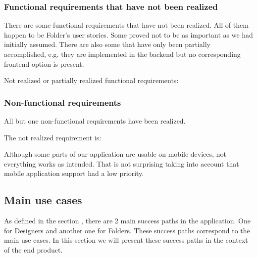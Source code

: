 \subsubsection{Functional requirements that have not been realized}

There are some functional requirements that have not been realized.
All of them happen to be Folder's user stories.
Some proved not to be as important as we had initially assumed.
There are also some that have only been partially accomplished, e.g. they are 
implemented in the backend but no corresponding frontend option is present.
\smallskip

Not realized or partially realized functional requirements:
\begin{enumerate}
	\setcounter{enumi}{12}

	
	\setcounter{enumi}{19}
\end{enumerate}

\subsubsection{Non-functional requirements}

All but one non-functional requirements have been realized.

The not realized requirement is:
\begin{enumerate}
	\setcounter{enumi}{4}
\end{enumerate}

Although some parts of our application are usable on mobile devices, 
not everything works as intended. That is not surprising taking into account that
mobile application support had a low priority.


\subsection{Main use cases}

As defined in the section , there are 2 main 
success paths in the application.
One for Designers and another one for Folders.
These success paths correspond to the main use cases.
In this section we will present these success paths in the context of the end product.

